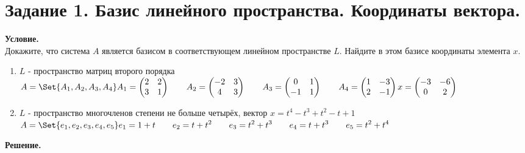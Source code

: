 \section{Задание 1. Базис линейного пространства. Координаты вектора.}

\textbf{Условие.}\\
Докажите, что система $A$ является базисом в соответствующем линейном пространстве $L$.
Найдите в этом базисе координаты элемента $x$.

\begin{enumerate}
    \item $L$ - пространство матриц второго порядка\\
    $\displaystyle A = \Set{A_1, A_2, A_3, A_4}\\
    A_1 = \begin{pmatrix}2 & 2 \\ 3 & 1\end{pmatrix}\qquad
    A_2 = \begin{pmatrix}-2 & 3 \\ 4 & 3\end{pmatrix}\qquad
    A_3 = \begin{pmatrix}0 & 1 \\ -1 & 1\end{pmatrix}\qquad
    A_4 = \begin{pmatrix}1 & -3 \\ 2 & -1\end{pmatrix}\\
    x = \begin{pmatrix}-3 & -6 \\ 0 & 2\end{pmatrix}$
    \item $L$ - пространство многочленов степени не больше четырёх, вектор $x = t^4 - t^3 + t^2 - t + 1$\\
    $\displaystyle A = \Set{e_1, e_2, e_3, e_4, e_5}\\
    e_1 = 1 + t\qquad
    e_2 = t + t^2\qquad
    e_3 = t^2 + t^3\qquad
    e_4 = t + t^3\qquad
    e_5 = t^2 + t^4\qquad$
\end{enumerate}
\vspace{10mm}
\noindent\textbf{Решение.}\\
